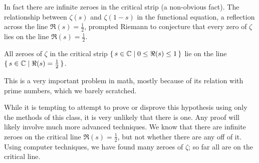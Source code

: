 \begin{center}
\end{center}

In fact there are infinite zeroes in the critical strip (a non-obvious fact). The relationship between $\zeta(s)$ and $\zeta(1-s)$ in the functional equation, a reflection across the line $\Re(s) = \frac{1}{2}$, prompted Riemann to conjecture that every zero of $\zeta$ lies on the line $\Re(s) = \frac{1}{2}$.

\begin{hypothesis}[Riemann]
All zeroes of $\zeta$ in the critical strip $\set{ s\in \mathbb{C}\mid 0 \leq \Re(s) \leq 1}$ lie on the line $\set{ s\in \mathbb{C}\mid \Re(s) = \frac{1}{2}}$.
\end{hypothesis}

This is a very important problem in math, mostly because of its relation with prime numbers, which we barely scratched.

\begin{remark}
While it is tempting to attempt to prove or disprove this hypothesis using only the methods of this class, it is very unlikely that there is one. Any proof will likely involve much more advanced techniques. We know that there are infinite zeroes on the critical line $\Re(s) = \frac{1}{2}$, but not whether there are any off of it. Using computer techniques, we have found many zeroes of $\zeta$; so far all are on the critical line.
\end{remark}